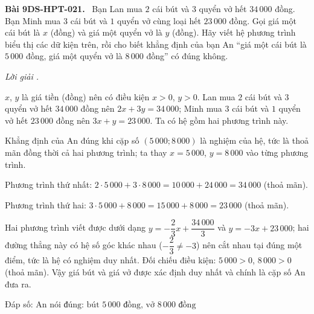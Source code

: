 \documentclass[12pt,a4paper]{article}
\newenvironment{problem}[1][]{\par\medskip\noindent\textbf{Bài #1.}\ }{\par}
\newenvironment{solution}[1][]{\par\noindent\textit{Lời giải #1.}\par}{\par}
\begin{document}
\begin{problem}[9DS-HPT-021]
Bạn Lan mua $2$ cái bút và $3$ quyển vở hết $34\,000$ đồng. Bạn Minh mua $3$ cái bút và $1$ quyển vở cùng loại hết $23\,000$ đồng. Gọi giá một cái bút là $x$ (đồng) và giá một quyển vở là $y$ (đồng). Hãy viết hệ phương trình biểu thị các dữ kiện trên, rồi cho biết khẳng định của bạn An ``giá một cái bút là $5\,000$ đồng, giá một quyển vở là $8\,000$ đồng'' có đúng không.

\begin{solution}
$x$, $y$ là giá tiền (đồng) nên có điều kiện $x > 0$, $y > 0$. Lan mua $2$ cái bút và $3$ quyển vở hết $34\,000$ đồng nên $2x + 3y = 34\,000$; Minh mua $3$ cái bút và $1$ quyển vở hết $23\,000$ đồng nên $3x + y = 23\,000$. Ta có hệ gồm hai phương trình này.

Khẳng định của An đúng khi cặp số $(5\,000; 8\,000)$ là nghiệm của hệ, tức là thoả mãn đồng thời cả hai phương trình; ta thay $x = 5\,000$, $y = 8\,000$ vào từng phương trình.

Phương trình thứ nhất: $2 \cdot 5\,000 + 3 \cdot 8\,000 = 10\,000 + 24\,000 = 34\,000$ (thoả mãn).

Phương trình thứ hai: $3 \cdot 5\,000 + 8\,000 = 15\,000 + 8\,000 = 23\,000$ (thoả mãn).

Hai phương trình viết được dưới dạng $y = -\dfrac{2}{3}x + \dfrac{34\,000}{3}$ và $y = -3x + 23\,000$; hai đường thẳng này có hệ số góc khác nhau ($-\dfrac{2}{3} \neq -3$) nên cắt nhau tại đúng một điểm, tức là hệ có nghiệm duy nhất. Đối chiếu điều kiện: $5\,000 > 0$, $8\,000 > 0$ (thoả mãn). Vậy giá bút và giá vở được xác định duy nhất và chính là cặp số An đưa ra.

Đáp số: $\boxed{\text{An nói đúng: bút } 5\,000 \text{ đồng, vở } 8\,000 \text{ đồng}}$
\end{solution}
\end{problem}
\end{document}
